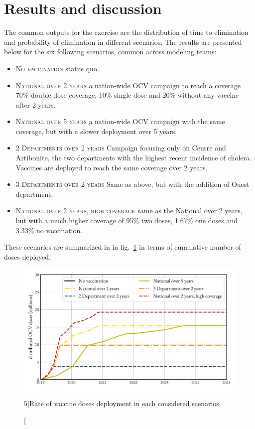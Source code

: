 \section{Results and discussion}
The common outputs for the exercise are the distribution of time to elimination and probability of elimination in different scenarios. The results are presented below for the six following scenarios, common across modeling teams:
\begin{itemize}
	\item \textsc{No vaccination} status quo.
	\item \textsc{National over 2 years} a nation-wide OCV campaign to reach a coverage 70\% double dose coverage, 10\% single dose and 20\% without any vaccine after 2 years.
	\item 	 \textsc{National over 5 years} a nation-wide OCV campaign with the same coverage, but with a slower deployment over 5 years.
	\item \textsc{2 Departments over 2 years} Campaign focusing only on Centre and Artibonite, the two departments with the highest recent incidence of cholera. Vaccines are deployed to reach the same coverage over 2 years.
	\item \textsc{3 Departments over 2 years} Same as above, but with the addition of Ouest department.
	\item \textsc{National over 2 years, high coverage} same as the National over 2 years, but with a much higher coverage of 95\% two doses, 1.67\% one doses and 3.33\% no vaccination.
\end{itemize}
These scenarios are summarized in in fig.~\ref{fig:deploy} in terms of cumulative number of doses deployed.

\begin{figure}
\begin{center}
\includegraphics{fig_cholera-haiti-ocv/haiti-deploy.pdf}
\caption[Rate of vaccine doses deployment in each considered scenarios][5\baselineskip]{Rate of vaccine doses deployment in each considered scenarios.}\label{fig:deploy}
\end{center}
\end{figure}


